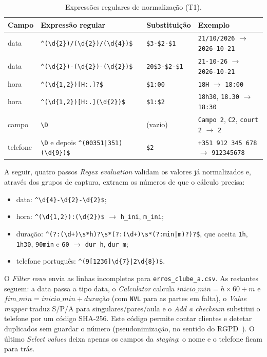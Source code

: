 \documentclass[11pt,a4paper]{article}
\begin{document}
\begin{table}[H]
\centering
\caption{Expressões regulares de normalização (T1).}
\label{tab:regex}
\small
\renewcommand{\arraystretch}{1.25}
\begin{tabular}{@{}p{1.5cm}p{5.4cm}p{2.2cm}p{5.4cm}@{}}
\toprule
\textbf{Campo} & \textbf{Expressão regular} & \textbf{Substituição} & \textbf{Exemplo} \\
\midrule
data & \verb!^(\d{2})/(\d{2})/(\d{4})$! & \verb!$3-$2-$1! & \texttt{21/10/2026} $\rightarrow$ \texttt{2026-10-21} \\
data & \verb!^(\d{2})-(\d{2})-(\d{2})$! & \verb!20$3-$2-$1! & \texttt{21-10-26} $\rightarrow$ \texttt{2026-10-21} \\
hora & \verb!^(\d{1,2})[H:.]?$! & \verb!$1:00! & \texttt{18H} $\rightarrow$ \texttt{18:00} \\
hora & \verb!^(\d{1,2})[H:.](\d{2})$! & \verb!$1:$2! & \texttt{18h30}, \texttt{18.30} $\rightarrow$ \texttt{18:30} \\
campo & \verb!\D! & (vazio) & \texttt{Campo 2}, \texttt{C2}, \texttt{court 2} $\rightarrow$ \texttt{2} \\
telefone & \verb!\D! e depois \verb!^(00351|351)(\d{9})$! & \verb!$2! & \texttt{+351 912 345 678} $\rightarrow$ \texttt{912345678} \\
\bottomrule
\end{tabular}
\end{table}

A seguir, quatro passos \textit{Regex evaluation} validam os valores já normalizados e, através dos grupos de captura, extraem os números de que o cálculo precisa:
\begin{itemize}[itemsep=1pt]
    \item data: \verb!^\d{4}-\d{2}-\d{2}$!;
    \item hora: \verb!^(\d{1,2}):(\d{2})$! $\rightarrow$ \texttt{h\_ini}, \texttt{m\_ini};
    \item duração: \verb!^(?:(\d+)\s*h)?\s*(?:(\d+)\s*(?:min|m)?)?$!, que aceita \texttt{1h}, \texttt{1h30}, \texttt{90min} e \texttt{60} $\rightarrow$ \texttt{dur\_h}, \texttt{dur\_m};
    \item telefone português: \verb!^(9[1236]\d{7}|2\d{8})$!.
\end{itemize}

O \textit{Filter rows} envia as linhas incompletas para \texttt{erros\_clube\_a.csv}. As restantes seguem: a data passa a tipo data, o \textit{Calculator} calcula $\mathit{inicio\_min} = h \times 60 + m$ e $\mathit{fim\_min} = \mathit{inicio\_min} + \mathit{duração}$ (com \texttt{NVL} para as partes em falta), o \textit{Value mapper} traduz S/P/A para singulares/pares/aula e o \textit{Add a checksum} substitui o telefone por um código SHA-256. Este código permite contar clientes e detetar duplicados sem guardar o número (pseudonimização, no sentido do RGPD~\cite{rgpd}). O último \textit{Select values} deixa apenas os campos da \textit{staging}: o nome e o telefone ficam para trás.
\end{document}
